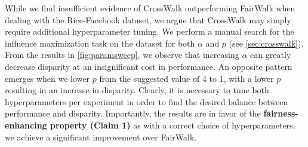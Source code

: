 While we find insufficient evidence of CrossWalk outperforming FairWalk when dealing with the Rice-Facebook dataset, we argue that CrossWalk may simply require additional hyperparameter tuning. We perform a manual search for the influence maximization task on the dataset for both $\alpha$ and $p$ (see \autoref{sec:crosswalk}).
From the results in \autoref{fig:paramsweep}, we observe that increasing $\alpha$ can greatly decrease disparity at an insignificant cost in performance. An opposite pattern emerges when we lower $p$ from the suggested value of 4 to 1, with a lower $p$ resulting in an increase in disparity. Clearly, it is necessary to tune both hyperparameters per experiment in order to find the desired balance between performance and disparity. Importantly, the results are in favor of the \textbf{fairness-enhancing property (Claim 1)} as with a correct choice of hyperparameters, we achieve a significant improvement over FairWalk.

